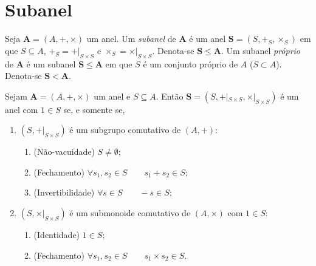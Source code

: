 \section{Subanel}

\begin{defi}
Seja $\bm A=(A,+,\times)$ um anel. Um \emph{subanel} de $\bm A$ é um anel $\bm S=(S,+_S,\times_S)$ em que $S \subseteq A$, $+_S = +|_{S \times S}$ e $\times_S = \times|_{S \times S}$. Denota-se $\bm S \leq \bm A$. Um subanel \emph{próprio} de $\bm A$ é um subanel $\bm S \leq \bm A$ em que $S$ é um conjunto próprio de $A$ ($S \subset A$). Denota-se $\bm S < \bm A$.
\end{defi}

\begin{prop}
Sejam $\bm A=(A,+,\times)$ um anel e $S \subseteq A$. Então $\bm S=(S,+|_{S \times S},\times|_{S \times S})$ é um anel com $1 \in S$ se, e somente se,
	\begin{enumerate}
	\item $(S,+|_{S \times S})$ é um subgrupo comutativo de $(A,+)$:
			\begin{enumerate}
			\item (Não-vacuidade) $S \neq \emptyset$;
			\item (Fechamento) $\forall s_1,s_2 \in S \qquad s_1 + s_2 \in S$;
			\item (Invertibilidade) $\forall s \in S \qquad -s \in S$;
			\end{enumerate}
	\item $(S,\times|_{S \times S})$ é um submonoide comutativo de $(A,\times)$ com $1 \in S$:
			\begin{enumerate}
			\item (Identidade) $1 \in S$;
			\item (Fechamento) $\forall s_1,s_2 \in S \qquad s_1 \times s_2 \in S$.
			\end{enumerate}
	\end{enumerate}
\end{prop}
